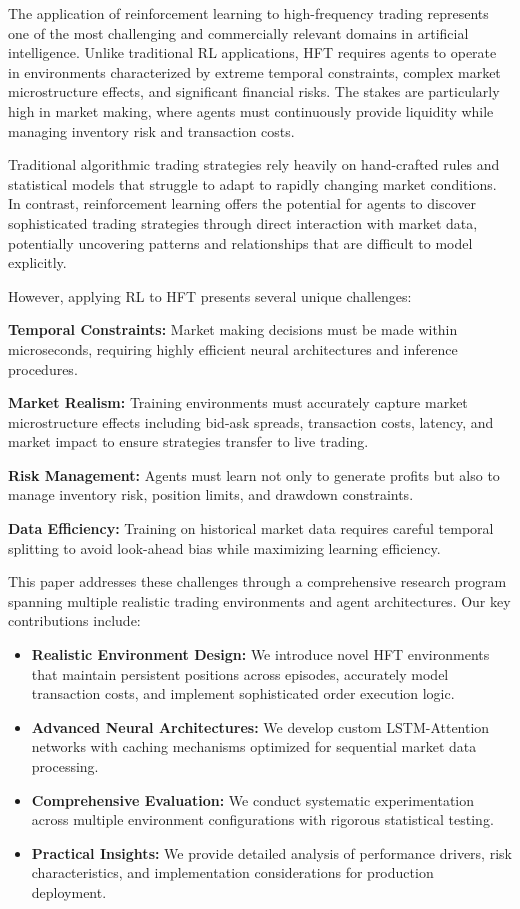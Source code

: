\documentclass[conference]{IEEEtran}
\begin{document}
The application of reinforcement learning to high-frequency trading represents one of the most challenging and commercially relevant domains in artificial intelligence. Unlike traditional RL applications, HFT requires agents to operate in environments characterized by extreme temporal constraints, complex market microstructure effects, and significant financial risks. The stakes are particularly high in market making, where agents must continuously provide liquidity while managing inventory risk and transaction costs.

Traditional algorithmic trading strategies rely heavily on hand-crafted rules and statistical models that struggle to adapt to rapidly changing market conditions. In contrast, reinforcement learning offers the potential for agents to discover sophisticated trading strategies through direct interaction with market data, potentially uncovering patterns and relationships that are difficult to model explicitly.

However, applying RL to HFT presents several unique challenges:

\textbf{Temporal Constraints:} Market making decisions must be made within microseconds, requiring highly efficient neural architectures and inference procedures.

\textbf{Market Realism:} Training environments must accurately capture market microstructure effects including bid-ask spreads, transaction costs, latency, and market impact to ensure strategies transfer to live trading.

\textbf{Risk Management:} Agents must learn not only to generate profits but also to manage inventory risk, position limits, and drawdown constraints.

\textbf{Data Efficiency:} Training on historical market data requires careful temporal splitting to avoid look-ahead bias while maximizing learning efficiency.

This paper addresses these challenges through a comprehensive research program spanning multiple realistic trading environments and agent architectures. Our key contributions include:

\begin{itemize}
\item \textbf{Realistic Environment Design:} We introduce novel HFT environments that maintain persistent positions across episodes, accurately model transaction costs, and implement sophisticated order execution logic.

\item \textbf{Advanced Neural Architectures:} We develop custom LSTM-Attention networks with caching mechanisms optimized for sequential market data processing.

\item \textbf{Comprehensive Evaluation:} We conduct systematic experimentation across multiple environment configurations with rigorous statistical testing.

\item \textbf{Practical Insights:} We provide detailed analysis of performance drivers, risk characteristics, and implementation considerations for production deployment.
\end{itemize}
\end{document}
